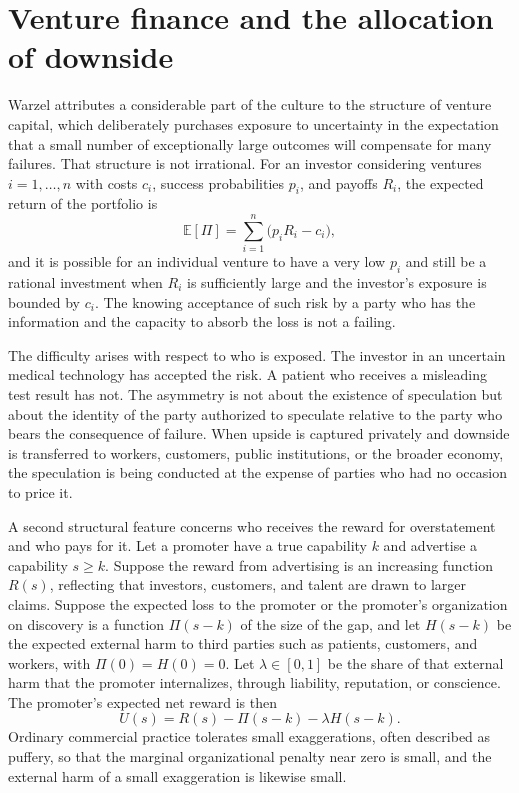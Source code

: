 \documentclass[11pt]{article}
\theoremstyle{plain}
\theoremstyle{definition}
\theoremstyle{remark}
\begin{document}
\section{Venture finance and the allocation of downside}

Warzel attributes a considerable part of the culture to the structure of venture capital, which deliberately purchases exposure to uncertainty in the expectation that a small number of exceptionally large outcomes will compensate for many failures. That structure is not irrational. For an investor considering ventures $i = 1, \dots, n$ with costs $c_i$, success probabilities $p_i$, and payoffs $R_i$, the expected return of the portfolio is
\[
\mathbb{E}[\Pi] = \sum_{i=1}^{n} \bigl( p_i R_i - c_i \bigr),
\]
and it is possible for an individual venture to have a very low $p_i$ and still be a rational investment when $R_i$ is sufficiently large and the investor's exposure is bounded by $c_i$. The knowing acceptance of such risk by a party who has the information and the capacity to absorb the loss is not a failing.

The difficulty arises with respect to who is exposed. The investor in an uncertain medical technology has accepted the risk. A patient who receives a misleading test result has not. The asymmetry is not about the existence of speculation but about the identity of the party authorized to speculate relative to the party who bears the consequence of failure. When upside is captured privately and downside is transferred to workers, customers, public institutions, or the broader economy, the speculation is being conducted at the expense of parties who had no occasion to price it.

A second structural feature concerns who receives the reward for overstatement and who pays for it. Let a promoter have a true capability $k$ and advertise a capability $s \ge k$. Suppose the reward from advertising is an increasing function $R(s)$, reflecting that investors, customers, and talent are drawn to larger claims. Suppose the expected loss to the promoter or the promoter's organization on discovery is a function $\Pi(s - k)$ of the size of the gap, and let $H(s - k)$ be the expected external harm to third parties such as patients, customers, and workers, with $\Pi(0) = H(0) = 0$. Let $\lambda \in [0,1]$ be the share of that external harm that the promoter internalizes, through liability, reputation, or conscience. The promoter's expected net reward is then
\[
U(s) = R(s) - \Pi(s - k) - \lambda H(s - k).
\]
Ordinary commercial practice tolerates small exaggerations, often described as puffery, so that the marginal organizational penalty near zero is small, and the external harm of a small exaggeration is likewise small.
\end{document}
